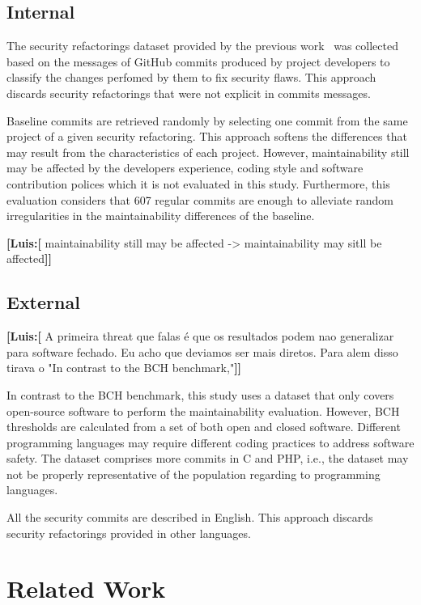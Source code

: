 \documentclass[10pt,conference]{IEEEtran}
\newcommand{\Luis}[1]{\textbf{[Luis:[}{\color{green} #1}\textbf{]]}}
\begin{document}
{\subsection{Internal}

The security refactorings dataset provided by the previous work~\cite{Reis:2017:IJSSE}
was collected based on the messages of GitHub commits produced by project developers
to classify the changes perfomed by them to fix security flaws. This approach
discards security refactorings that were not explicit in commits messages.

Baseline commits are retrieved randomly by selecting one commit from the same
project of a given security refactoring. This approach softens the differences
that may result from the characteristics of each project. However,
maintainability still may be affected by the developers experience, coding
style and software contribution polices which it is not evaluated in this
study. Furthermore, this evaluation considers that 607 regular commits are
enough to alleviate random irregularities in the maintainability differences of
the baseline.

\Luis{maintainability still may be affected -> maintainability may sitll be affected}

\subsection{External}

\Luis{A primeira threat que falas é que os resultados podem nao generalizar
para software fechado. Eu acho que deviamos ser mais diretos. Para alem disso
tirava o "In contrast to the BCH benchmark,"}

In contrast to the BCH benchmark, this study uses a dataset that only covers
open-source software to perform the maintainability evaluation. However, BCH
thresholds are calculated from a set of both open and closed software.
Different programming languages may require different coding practices to
address software safety. The dataset comprises more commits in C and PHP, i.e.,
the dataset may not be properly representative of the population regarding to
programming languages.

All the security commits are described in English. This approach discards
security refactorings provided in other languages.

\section{Related Work}\label{sec:rw}

}
\end{document}
